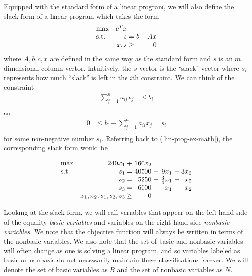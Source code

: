 \documentclass{article}
\begin{document}
Equipped with the standard form of a linear program, we will also define the slack form of a linear program which takes the form
\begin{equation*}
\setlength\arraycolsep{1.5pt}
  \begin{array}{l@{\quad} r c r} 
    \max          & c^{T}x & & \\
    \mathrm{s.t.} &  s & = & b - Ax \\
                  & x, s & \geq &  0 \\
  \end{array}
\end{equation*}
where $A, b, c, x$ are defined in the same way as the standard form and $s$ is an $m$ dimensional column vector. Intuitively, the $s$ vector is the ``slack'' vector where $s_i$ represents how much ``slack'' is left in the $i$th constraint. We can think of the constraint
\begin{align*}
    \sum_{j = 1}^n a_{ij} x_j &\leq b_i \\
\end{align*}
as
\begin{align*}
    0 &\leq b_i - \sum_{j = 1}^n a_{ij} x_j  = s_i\\
\end{align*}
for some non-negative number $s_i$. Referring back to (\ref{lin-prog-ex-math}), the corresponding slack form would be

\begin{equation}
\setlength\arraycolsep{1.5pt}
  \begin{array}{l@{\quad} r c r c r c r}
    \max          & 240x_1 & + &         160x_2 &      &    \\
    \mathrm{s.t.} & s_1 & = & 40500 & - & 9x_1 & - & 3x_2 \\
    & s_2 & = & 5250 & - & \frac{3}{4}x_1 & - & x_2 \\
    & s_3 & = & 6000 & - & x_1 & - & x_2 \\
    & x_1, x_2, s_1, s_2, s_3 & \geq & 0 &&&&  \\
  \end{array}
  \label{lin-prog-ex-math-slack}
\end{equation}

Looking at the slack form, we will call variables that appear on the left-hand-side of the equality \textit{basic variables} and variables on the right-hand-side \textit{nonbasic variables}. We note that the objective function will always be written in terms of the nonbasic variables. We also note that the set of basic and nonbasic variables will often change as one is solving a linear program, and so variables labeled as basic or nonbasic do not necessarily maintain these classifications forever. We will denote the set of basic variables as $B$ and the set of nonbasic variables as $N$.
\end{document}

